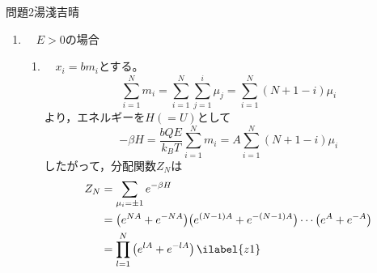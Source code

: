 \documentclass[fleqn]{jbook}
\begin{document}
\begin{answer}{問題2}{湯淺吉晴}
\begin{enumerate}
\begin{enumerate}
        \vspace{1mm}
        \item 　$E = 0$なので，内部エネルギー$U$は分子の形状によらない。Helmholtzの自由エネルギー$F = U - TS$，$dF = -SdT + Xdx_N$より外力$X$を求めると次のようになる。
\begin{align}
X = \left.\frac{\partial F}{\partial x_N}\right|_T 
 &= - T\left.\frac{\partial S}{\partial x_N}\right|_T  \\
 &= k_BTN\left[\frac{1}{2L}\log \left(1 + \frac{x_N}{L}\right) + \frac{1}{2L} - \frac{1}{2L}\log \left(1 - \frac{x_N}{L}\right) - \frac{1}{2L}\right] \nonumber \\
 &= \frac{k_BT}{2b}\log \dfrac{1 + x_N / L}{1 - x_N / L}
\end{align}
        
        \item 　$x_N / L \ll 1$のとき
\begin{align}
X &= \frac{k_BT}{2b}\left[\log \left(1 + \frac{x_N}{L}\right) - \log \left(1 - \frac{x_N}{L}\right)\right] \simeq \frac{k_BT}{2b}\left(\frac{x_N}{L} + \frac{x_N}{L}\right) = \frac{k_BT}{Nb^2}x_N \ilabel{1c}
\end{align}
関係式$(7)$はこの分子がHookeの法則（外力$X$が変位$x_N$に比例する）に従うゴム状の弾性体であることを表している。\\
\end{enumerate}

    \item 　$E > 0$の場合
    
    \begin{enumerate}
        \item 　$x_i = bm_i$とする。
\begin{equation}
\sum_{i=1}^{N}m_i = \sum_{i=1}^{N}\sum_{j=1}^{i}\mu_j = \sum_{i=1}^{N}(N + 1 - i)\mu_i
\end{equation}
より，エネルギーを$H( = U)$として
\begin{equation}
-\beta H = \frac{bQE}{k_BT}\sum_{i=1}^{N}m_i = A\sum_{i=1}^{N}(N + 1 - i)\mu_i
\end{equation}
したがって，分配関数$Z_N$は
\begin{align}
Z_N &= \sum_{\mu_i = \pm 1}e^{- \beta H} \\
 &= \bigl(e^{NA} + e^{- NA}\bigr)\bigl(e^{(N - 1)A} + e^{- (N - 1)A}\bigr)\cdots \bigl(e^{A} + e^{- A}\bigr) \nonumber \\
 &= \prod_{l = 1}^{N}\left(e^{lA} + e^{- lA}\right) \ilabel{z1}
\end{align}
        

\end{enumerate}
\end{enumerate}
\end{answer}
\end{document}
